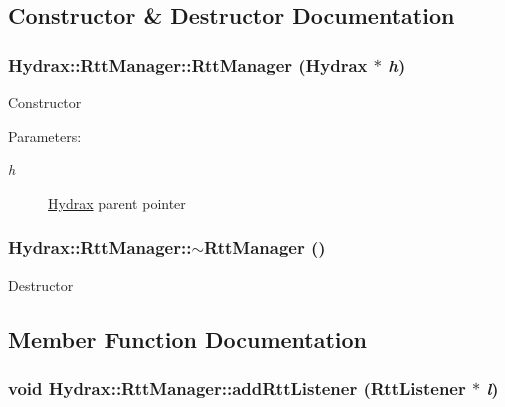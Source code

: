 \begin{CompactItemize}
\subsection{Constructor \& Destructor Documentation}
\hypertarget{class_hydrax_1_1_rtt_manager_5e3cb1cebd7adf7bf69b7b15e120db71}{
\subsubsection[{RttManager}]{\setlength{\rightskip}{0pt plus 5cm}Hydrax::RttManager::RttManager ({\bf Hydrax} $\ast$ {\em h})}}
\label{class_hydrax_1_1_rtt_manager_5e3cb1cebd7adf7bf69b7b15e120db71}


Constructor \begin{Desc}
\item[Parameters:]
\begin{description}
\item[{\em h}]\hyperlink{class_hydrax_1_1_hydrax}{Hydrax} parent pointer \end{description}
\end{Desc}
\hypertarget{class_hydrax_1_1_rtt_manager_bbce4b6993d9362d11366ba11fbee326}{
\subsubsection[{$\sim$RttManager}]{\setlength{\rightskip}{0pt plus 5cm}Hydrax::RttManager::$\sim$RttManager ()}}
\label{class_hydrax_1_1_rtt_manager_bbce4b6993d9362d11366ba11fbee326}


Destructor 

\subsection{Member Function Documentation}
\hypertarget{class_hydrax_1_1_rtt_manager_cd9d1c09314e9ada6f8f646b0b97dc48}{
\subsubsection[{addRttListener}]{\setlength{\rightskip}{0pt plus 5cm}void Hydrax::RttManager::addRttListener ({\bf RttListener} $\ast$ {\em l})}}
\label{class_hydrax_1_1_rtt_manager_cd9d1c09314e9ada6f8f646b0b97dc48}



\end{CompactItemize}
